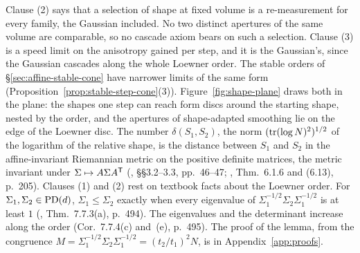 Clause (2) says that a selection of shape at fixed volume is a re-measurement for every family, the
Gaussian included. No two distinct apertures of the same volume are comparable, so no cascade axiom
bears on such a selection. Clause (3) is a speed limit on the anisotropy gained per step, and it is
the Gaussian's, since the Gaussian cascades along the whole Loewner order. The stable orders of
\S\ref{sec:affine-stable-cone} have narrower limits of the same form
(Proposition~\ref{prop:stable-step-cone}(3)). Figure~\ref{fig:shape-plane} draws both in the plane:
the shapes one step can reach form discs around the starting shape, nested by the order, and the
apertures of shape-adapted smoothing lie on the edge of the Loewner disc. The number
$\delta(S_1,S_2)$, the norm $(\operatorname{tr}(\log N)^2)^{1/2}$ of the logarithm of the relative shape, is the
distance between $S_1$ and $S_2$ in the affine-invariant Riemannian metric on the positive definite
matrices, the metric invariant under $\Sigma \mapsto A\Sigma A^{\mathsf{T}}$ (,
\S\S3.2--3.3, pp.~46--47; , Thm.~6.1.6 and (6.13), p.~205).
Clauses (1) and (2) rest on textbook facts about the Loewner order. For
$\Sigma_1, \Sigma_2 \in \mathrm{PD}(d)$, $\Sigma_1 \le \Sigma_2$ exactly when every eigenvalue of
$\Sigma_1^{-1/2}\Sigma_2\Sigma_1^{-1/2}$ is at least $1$ (, Thm.~7.7.3(a),
p.~494). The eigenvalues and the determinant increase along the order (Cor.~7.7.4(c) and~(e),
p.~495).
The proof of the lemma, from the congruence $M = \Sigma_1^{-1/2}\Sigma_2\Sigma_1^{-1/2} =
(t_2/t_1)^2N$, is in Appendix~\ref{app:proofs}.

